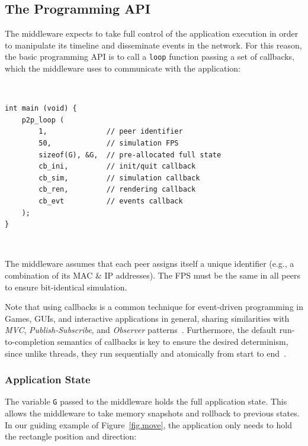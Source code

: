 \documentclass[10pt,journal,compsoc]{IEEEtran}
\newcommand{\code}[1]  {\texttt{\small{#1}}}
\begin{document}
\subsection{The Programming API}
\label{sec.tml.api}

The middleware expects to take full control of the application execution in
order to manipulate its timeline and disseminate events in the network.
For this reason, the basic programming API is to call a \code{loop} function
passing a set of callbacks, which the middleware uses to communicate with the
application:

{\footnotesize
~
\begin{verbatim}
int main (void) {
    p2p_loop (
        1,              // peer identifier
        50,             // simulation FPS
        sizeof(G), &G,  // pre-allocated full state
        cb_ini,         // init/quit callback
        cb_sim,         // simulation callback
        cb_ren,         // rendering callback
        cb_evt          // events callback
    );
}
\end{verbatim}
~
}

The middleware assumes that each peer assigns itself a unique identifier (e.g.,
a combination of its MAC \& IP addresses).
The FPS must be the same in all peers to ensure bit-identical simulation.

Note that using callbacks is a common technique for event-driven
programming in Games, GUIs, and interactive applications in general, sharing
similarities with \emph{MVC}, \emph{Publish-Subscribe}, and \emph{Observer}
patterns~\cite{meyer,nystrom}.
%
Furthermore, the default run-to-completion semantics of callbacks is key to
ensure the desired determinism, since unlike threads, they run sequentially and
atomically from start to end~\cite{events,threads}.


\subsubsection{Application State}
\label{sec.tml.api.state}

The variable \code{G} passed to the middleware holds the full application
state.
This allows the middleware to take memory snapshots and rollback to previous
states.
In our guiding example of Figure~\ref{fig.move}, the application only needs to
hold the rectangle position and direction:
\end{document}

